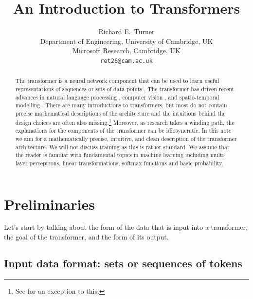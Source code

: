 \documentclass{article}
\title{An Introduction to Transformers}
\author{Richard E.~Turner\\ Department of Engineering, University of Cambridge, UK\\ Microsoft Research, Cambridge, UK\\
\tt{ret26@cam.ac.uk}}
\begin{document}
\begin{titlepage}
\thispagestyle{empty}
\maketitle

\begin{abstract}
The transformer is a neural network component that can be used to learn useful representations of sequences or sets of data-points \citep{NIPS2017_3f5ee243}. The transformer has driven recent advances in natural language processing  \citep{devlin-etal-2019-bert}, computer vision \citep{vision-transformer}, and spatio-temporal modelling \citep{bi2022panguweather}. There are many introductions to transformers, but most do not contain precise mathematical descriptions of the architecture and the intuitions behind the design choices are often also missing.\footnote{See \cite{phuong2022formal} for an exception to this.} Moreover, as research takes a winding path, the explanations for the components of the transformer can be idiosyncratic. In this note we aim for a mathematically precise, intuitive, and clean description of the transformer architecture. We will not discuss training as this is rather standard. We  assume that the reader is familiar with fundamental topics in machine learning including multi-layer perceptrons, linear transformations, softmax functions and basic probability. 


\end{abstract}

\end{titlepage}



\section{Preliminaries}

Let's start by talking about the form of the data that is input into a transformer, the goal of the transformer, and the form of its output.

\subsection{Input data format: sets or sequences of tokens}
\end{document}
